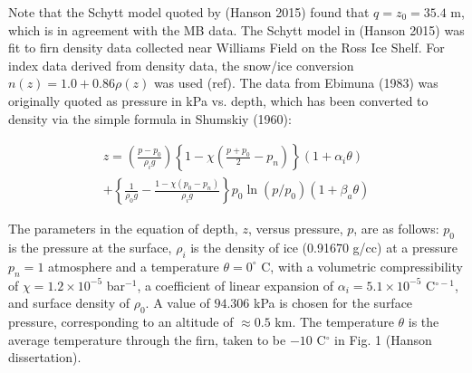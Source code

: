 \documentclass[12pt]{article}
\begin{document}
Note that the Schytt model quoted by (Hanson 2015) found that $q = z_0 = 35.4$ m, which is in agreement with the MB data.  The Schytt model in (Hanson 2015) was fit to firn density data collected near Williams Field on the Ross Ice Shelf.  For index data derived from density data, the snow/ice conversion $n(z) = 1.0 + 0.86\rho(z)$ was used (ref).  The data from Ebimuna (1983) was originally quoted as pressure in kPa vs. depth, which has been converted to density via the simple formula in Shumskiy (1960):

\begin{multline}
z = \left( \frac{p-p_0}{\rho_i g}\right) \left \lbrace 1-\chi\left(\frac{p+p_0}{2} - p_n \right) \right \rbrace (1+\alpha_i\theta) \\ + \left \lbrace \frac{1}{\rho_0 g}-\frac{1-\chi(p_0-p_n)}{\rho_i g} \right \rbrace p_0 \ln (p/p_0) (1+\beta_a\theta)
\end{multline}

The parameters in the equation of depth, $z$, versus pressure, $p$, are as follows: $p_0$ is the pressure at the surface, $\rho_i$ is the density of ice (0.91670 g/cc) at a pressure $p_n=1$ atmosphere and a temperature $\theta = 0^{\circ}$ C, with a  volumetric compressibility of $\chi = 1.2 \times 10^{-5}$ bar$^{-1}$, a coefficient of linear expansion of $\alpha_i = 5.1 \times 10^{-5}$ C$^{\circ -1}$, and surface density of $\rho_0$.  A value of $94.306$ kPa is chosen for the surface pressure, corresponding to an altitude of $\approx 0.5$ km.  The temperature $\theta$ is the average temperature through the firn, taken to be $-10$ C$^{\circ}$ in Fig. 1 (Hanson dissertation).
\end{document}
